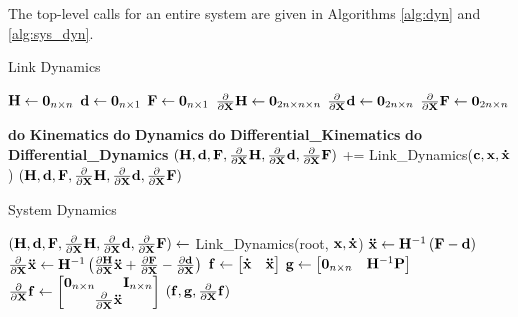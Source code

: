 \noindent The top-level calls for an entire system are given in Algorithms \ref{alg:dyn} and \ref{alg:sys_dyn}.
\begin{algorithm}[H]
	\caption{Link Dynamics}\label{alg:dyn}
	\begin{algorithmic}
	\State $\H \gets \ZERO_{n \times n}$
	\State $\d \gets \ZERO_{n \times 1}$
	\State $\F \gets \ZERO_{n \times 1}$
	\State $\partialX{}\H \gets \ZERO_{2n \times n \times n}$
	\State $\partialX{}\d \gets \ZERO_{2n \times n}$
	\State $\partialX{}\F \gets \ZERO_{2n \times n}$
	
	\State \textbf{do} \textbf{Kinematics}
	\State \textbf{do} \textbf{Dynamics}
	\State \textbf{do} \textbf{Differential\_Kinematics}
	\State \textbf{do} \textbf{Differential\_Dynamics}
	\State $(\H, \d,\F, \partialX{}\H, \partialX{}\d,\partialX{}\F)  $ += Link\_Dynamics($\mathbf{c}, \x, \dotx$) 
	\EndFor
	\State \Return $(\H, \d,\F, \partialX{}\H, \partialX{}\d,\partialX{}\F)$ 
	\end{algorithmic}
\end{algorithm}

\begin{algorithm}[H]
	\caption{System Dynamics}\label{alg:sys_dyn}
	\begin{algorithmic}
	\State $(\H, \d,\F, \partialX{}\H, \partialX{}\d,\partialX{}\F) \gets $ Link\_Dynamics(root, $\x, \dotx$) 
	\State $\ddotx \gets \H^{-1}\left (\F - \d \right )$
	\State $\partialX{} \ddotx \gets \H^{-1}\left (\partialX{\H} \ddotx + \partialX{\F} - \partialX{\d} \right )$
	\State $\f \gets \begin{bmatrix} \dotx & \ddotx \end{bmatrix}$
	\State $\g \gets \begin{bmatrix} \ZERO_{n \times n} & \H^{-1}\P \end{bmatrix}$
	\State $\partialX{}\f \gets \begin{bmatrix}
    \ZERO_{n \times n}  ~~~~~~ \EYE_{n \times n}  \\
    \partialX{} \ddotx 
    \end{bmatrix}$
    \State \Return $(\f, \g, \partialX{}\f)$ 
	\end{algorithmic}
\end{algorithm}
